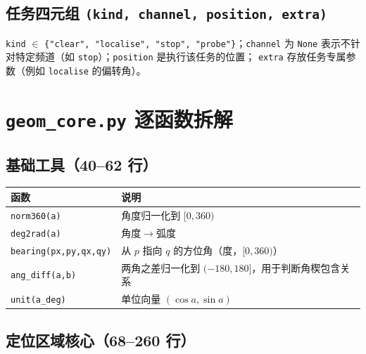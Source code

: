 \subsection{任务四元组 \texttt{(kind, channel, position, extra)}}

\texttt{kind} $\in$ \texttt{\{"clear", "localise", "stop", "probe"\}}；\texttt{channel} 为 \texttt{None}
表示不针对特定频道（如 \texttt{stop}）；\texttt{position} 是执行该任务的位置；
\texttt{extra} 存放任务专属参数（例如 \texttt{localise} 的偏转角）。

\section{\texttt{geom\_core.py} 逐函数拆解}

\subsection{基础工具（40--62 行）}

\begin{tabular}{p{4.4cm}p{9.4cm}}
\toprule
函数 & 说明 \\ \midrule
\texttt{norm360(a)} & 角度归一化到 $[0,360)$ \\
\texttt{deg2rad(a)} & 角度$\to$弧度 \\
\texttt{bearing(px,py,qx,qy)} & 从 $p$ 指向 $q$ 的方位角（度，$[0,360)$） \\
\texttt{ang\_diff(a,b)} & 两角之差归一化到 $(-180,180]$，用于判断角楔包含关系 \\
\texttt{unit(a\_deg)} & 单位向量 $(\cos a,\sin a)$ \\
\bottomrule
\end{tabular}

\subsection{定位区域核心（68--260 行）}

